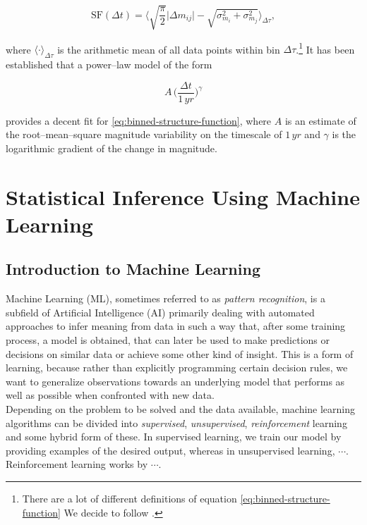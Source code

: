 \begin{equation}
\text{SF}(\Delta t) = \big\langle \sqrt{\frac{\pi}{2}} \big| \Delta m_{ij}  \big| - \sqrt{\sigma_{m_i}^2 + \sigma_{m_j}^2} \big\rangle_{\Delta \tau},
\label{eq:binned-structure-function}
\end{equation}

where $\langle \cdot \rangle_{\Delta \tau}$ is the arithmetic mean of all data points within bin $\Delta \tau$.\footnote{There are a lot of different definitions of equation \eqref{eq:binned-structure-function} We decide to follow \citet{schmidt2010}.} It has been established \citep{richards2006} that a power--law model of the form

\begin{equation}
A \, \big(\frac{\Delta t}{1 \, \unit{yr}}\big)^\gamma
\end{equation}

provides a decent fit for \eqref{eq:binned-structure-function}, where $A$ is an estimate of the root--mean--square magnitude variability on the timescale of $1 \, \unit{yr}$ and $\gamma$ is the logarithmic gradient of the change in magnitude.

\section{Statistical Inference Using Machine Learning}

\subsection{Introduction to Machine Learning}
\label{sec:introduction-machine-learning}

Machine Learning (ML), sometimes referred to as \emph{pattern recognition}, is a subfield of Artificial Intelligence (AI) primarily dealing with automated approaches to infer meaning from data in such a way that, after some training process, a model is obtained, that can later be used to make predictions or decisions on similar data or achieve some other kind of insight. This is a form of learning, because rather than explicitly programming certain decision rules, we want to generalize observations towards an underlying model that performs as well as possible when confronted with new data.\\

Depending on the problem to be solved and the data available, machine learning algorithms can be divided into \emph{supervised}, \emph{unsupervised}, \emph{reinforcement} learning and some hybrid form of these. In supervised learning, we train our model by providing examples of the desired output, whereas in unsupervised learning, $\cdots$. Reinforcement learning works by $\cdots$.\\

